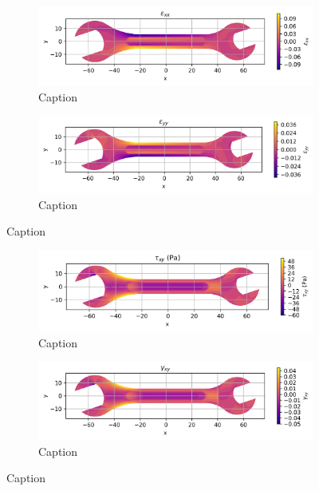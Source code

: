 \begin{figure}[H]
  \centering
  \begin{subfigure}[t]{0.49\textwidth}
    \centering
    \includegraphics[width=\textwidth]{GRAFICOS/Case b - epsilon_xx.png}
    \caption{Caption}
    \label{fig:deformada_reacciones}
  \end{subfigure}
  \hfill
  \begin{subfigure}[t]{0.49\textwidth}
    \centering
    \includegraphics[width=\textwidth]{GRAFICOS/Case b - epsilon_yy.png}
    \caption{Caption}
    \label{fig:von_mises}
  \end{subfigure}
  \caption{Caption}
  \label{fig:analisis_estructural}
\end{figure}


\begin{figure}[H]
  \centering
  \begin{subfigure}[t]{0.49\textwidth}
    \centering
    \includegraphics[width=\textwidth]{GRAFICOS/Case b - tau_xy.png}
    \caption{Caption}
    \label{fig:deformada_reacciones}
  \end{subfigure}
  \hfill
  \begin{subfigure}[t]{0.49\textwidth}
    \centering
    \includegraphics[width=\textwidth]{GRAFICOS/Case b - gamma_xy.png}
    \caption{Caption}
    \label{fig:von_mises}
  \end{subfigure}
  \caption{Caption}
  \label{fig:analisis_estructural}
\end{figure}

